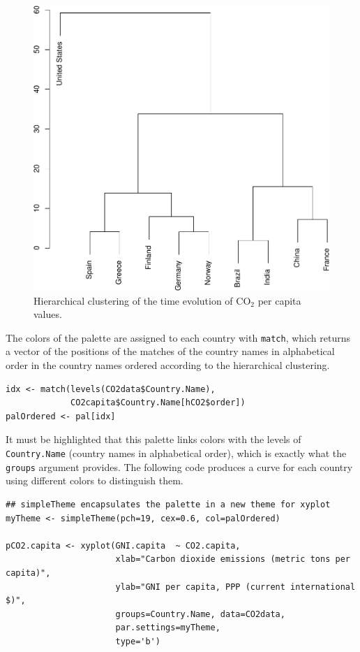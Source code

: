 \documentclass[smallroyalvopaper]{memoir}
\begin{document}
\begin{figure}[htb]
\centering
\includegraphics[width=.9\linewidth]{figs/hclust.pdf}
\caption{\label{fig:hclustCO2}Hierarchical clustering of the time evolution of $\mathrm{CO_2}$ per capita values.}
\end{figure}


The colors of the palette are assigned to each country with \texttt{match},
which returns a vector of the positions of the matches of the country
names in alphabetical order in the country names ordered according to
the hierarchical clustering.
\lstset{language=R,numbers=none}
\begin{lstlisting}
idx <- match(levels(CO2data$Country.Name), 
             CO2capita$Country.Name[hCO2$order])
palOrdered <- pal[idx]
\end{lstlisting}
It must be highlighted that this palette links colors with the levels
of \texttt{Country.Name} (country names in alphabetical order), which is
exactly what the \texttt{groups} argument provides. The following code
produces a curve for each country using different colors to
distinguish them.


\lstset{language=R,numbers=none}
\begin{lstlisting}
## simpleTheme encapsulates the palette in a new theme for xyplot
myTheme <- simpleTheme(pch=19, cex=0.6, col=palOrdered)

pCO2.capita <- xyplot(GNI.capita  ~ CO2.capita,
                      xlab="Carbon dioxide emissions (metric tons per capita)",
                      ylab="GNI per capita, PPP (current international $)",
                      groups=Country.Name, data=CO2data,
                      par.settings=myTheme,
                      type='b')
\end{lstlisting}
\end{document}
